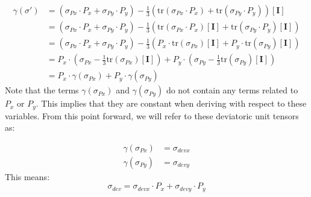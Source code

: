    \begin{align}
	   \gamma(\sigma') &= \left(\sigma_{Px} \cdot P_x + \sigma_{Py} \cdot P_y\right) - 
                       \frac{1}{3} \left(\mathrm{tr} \left(\sigma_{Px} \cdot P_x\right) +
                       \mathrm{tr} \left( \sigma_{Py} \cdot P_y\right)\right) 
                       \left[ \mathbf{I} \right]\nonumber \\
                      &= \left(\sigma_{Px} \cdot P_x + \sigma_{Py} \cdot P_y\right) - 
		       \frac{1}{3} \left(\mathrm{tr} \left(\sigma_{Px} \cdot P_x\right)
		       \left[ \mathbf{I} \right] +
                       \mathrm{tr} \left( \sigma_{Py} \cdot P_y\right) 
                       \left[ \mathbf{I} \right]\right)\nonumber\\
		      &= \left(\sigma_{Px} \cdot P_x + \sigma_{Py} \cdot P_y\right) - 
		       \frac{1}{3} \left(P_x \cdot \mathrm{tr} \left(\sigma_{Px}\right)
		       \left[ \mathbf{I} \right] +
                       P_y \cdot \mathrm{tr} \left( \sigma_{Py} \right) 
                       \left[ \mathbf{I} \right]\right)\nonumber\\
		      &= P_x \cdot \left( \sigma_{Px} - \frac{1}{3} \mathrm{tr}(\sigma_{Px})
			 \left[ \mathbf{I} \right] \right) + P_y \cdot \left( \sigma_{Py} -
			 \frac{1}{3} \mathrm{tr}(\sigma_{Py})
			 \left[ \mathbf{I} \right] \right)\nonumber\\
		      &= P_x \cdot \gamma(\sigma_{Px}) + P_y \cdot \gamma(\sigma_{Py})
   \end{align}
Note that the terms $\gamma(\sigma_{Px})$ and $\gamma(\sigma_{Py})$ do not contain any terms related to $P_x$ or $P_y$. This implies that they are constant when deriving with respect to these variables. From this point forward, we will refer to these deviatoric unit tensors as:

   \begin{align*}
	   \gamma(\sigma_{Px}) &= \sigma_{devx}\\
	   \gamma(\sigma_{Py}) &= \sigma_{devy}
   \end{align*}
This means: 
   \begin{equation}
	   \sigma_{dev} = \sigma_{devx} \cdot P_x + \sigma_{devy} \cdot P_y
   \end{equation}

